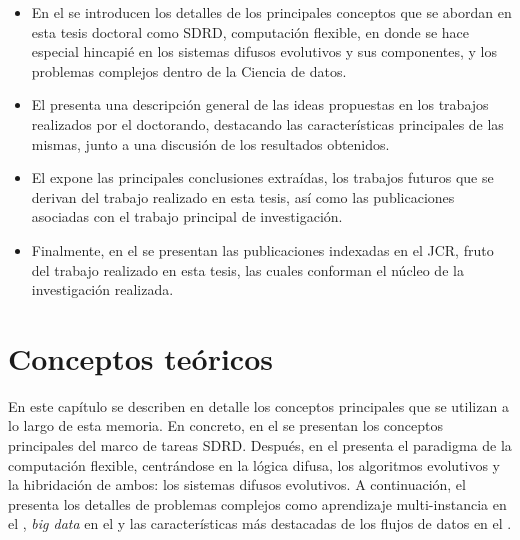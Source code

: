 \documentclass[c5paper,10pt,twoside]{book}	   	%
\begin{document}
\begin{itemize}


	\item En el  se introducen los detalles de los principales conceptos que se abordan en esta tesis doctoral como \ac{SDRD}, computación flexible, en donde se hace especial hincapié en los sistemas difusos evolutivos y sus componentes, y los problemas complejos dentro de la Ciencia de datos.
	
	\item El  presenta una descripción general de las ideas propuestas en los trabajos realizados por el doctorando, destacando las características principales de las mismas, junto a una discusión de los resultados obtenidos.
	
	\item El  expone las principales conclusiones extraídas, los trabajos futuros que se derivan del trabajo realizado en esta tesis, así como las publicaciones asociadas con el trabajo principal de investigación.
	
	\item Finalmente, en el  se presentan las publicaciones indexadas en el \ac{JCR}, fruto del trabajo realizado en esta tesis, las cuales conforman el núcleo de la investigación realizada.
\end{itemize}






%
\clearpage{} \cleardoublepage

\lhead[\sc{Introduction}]{} 	

   \lhead[ ]{\footnotesize{\sc{\thesection: \rm\rightmark}}}  

\renewcommand{\figurename}{Figura}
\renewcommand{\tablename}{Tabla}

\clearpage{}


\chapter{Conceptos teóricos} \label{chap:background}

En este capítulo se describen en detalle los conceptos principales que se utilizan a lo largo de esta memoria. En concreto, en el  se presentan los conceptos principales del marco de tareas \ac{SDRD}. Después, en el  presenta el paradigma de la computación flexible, centrándose en la lógica difusa, los algoritmos evolutivos y la hibridación de ambos: los sistemas difusos evolutivos. A continuación, el  presenta los detalles de problemas complejos como aprendizaje multi-instancia en el , \textit{big data} en el  y las características más destacadas de los flujos de datos en el .
\end{document}
